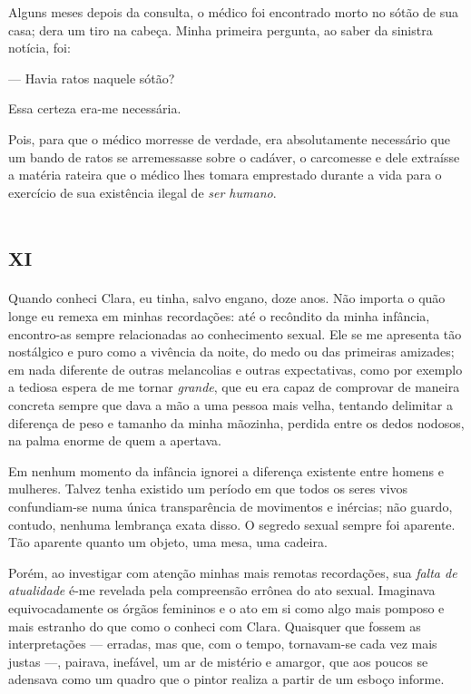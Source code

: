 Alguns meses depois da consulta, o médico foi encontrado morto no sótão de sua casa; dera um tiro na cabeça.
Minha primeira pergunta, ao saber da sinistra notícia, foi:

--- Havia ratos naquele sótão?

Essa certeza era-me necessária.

Pois, para que o médico morresse de verdade, era absolutamente necessário que um bando de ratos se arremessasse sobre o cadáver, o carcomesse e dele extraísse a matéria rateira que o médico lhes tomara emprestado durante a vida para o exercício de sua existência ilegal de \textit{ser humano}.


\chapter*{\huge\centering\textsc{xi}}

Quando conheci Clara, eu tinha, salvo engano, doze anos. Não importa o quão longe eu remexa em minhas recordações: até o recôndito da minha infância, encontro-as sempre relacionadas ao conhecimento sexual. Ele se me apresenta tão nostálgico e puro como a vivência da noite, do medo ou das primeiras amizades; em nada diferente de outras melancolias e outras expectativas, como por exemplo a tediosa espera de me tornar \textit{grande}, que eu era capaz de comprovar de maneira concreta sempre que dava a mão a uma pessoa mais velha, tentando delimitar a diferença de peso e tamanho da minha mãozinha, perdida entre os dedos nodosos, na palma enorme de quem a apertava.

Em nenhum momento da infância ignorei a diferença existente entre homens e mulheres. Talvez tenha existido um período em que todos os seres vivos confundiam-se numa única transparência de movimentos e inércias; não guardo, contudo, nenhuma lembrança exata disso. O segredo sexual sempre foi aparente. Tão aparente quanto um objeto, uma mesa, uma cadeira.

Porém, ao investigar com atenção minhas mais remotas recordações, sua \textit{falta de atualidade} é-me revelada pela compreensão errônea do ato sexual. Imaginava equivocadamente os órgãos femininos e o ato em si como algo mais pomposo e mais estranho do que como o conheci com Clara. Quaisquer que fossem as interpretações --- erradas, mas que, com o tempo, tornavam-se cada vez mais justas ---, pairava, inefável, um ar de mistério e amargor, que aos poucos se adensava como um quadro que o pintor realiza a partir de um esboço informe.


